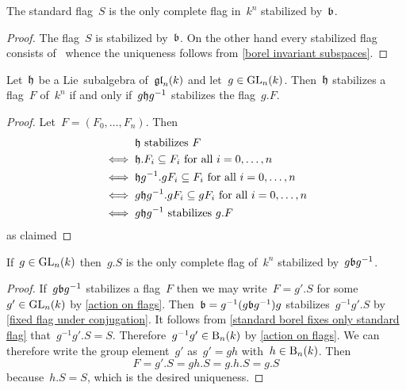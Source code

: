 \begin{corollary}
  \label{standard borel fixes only standard flag}
  The standard flag~$S$ is the only complete flag in~$k^n$ stabilized by~$\blie$.
\end{corollary}

\begin{proof}
  The flag~$S$ is stabilized by~$\blie$.
  On the other hand every stabilized flag consists of~{\subrepresentations{$\blie$}} whence the uniqueness follows from \cref{borel invariant subspaces}.
\end{proof}

\begin{lemma}
  \label{fixed flag under conjugation}
  Let~$\mathfrak{h}$ be a Lie~subalgebra of~$\mathfrak{gl}_n(k)$ and let~$g \in \operatorname{GL}_n(k)$.
  Then~$\mathfrak{h}$ stabilizes a flag~$F$ of~$k^n$ if and only if~$g \mathfrak{h} g^{-1}$ stabilizes the flag~$g.F$.
\end{lemma}

\begin{proof}
  Let~$F = (F_0, \dotsc, F_n)$.
  Then
  \begin{align*}
    {}&
    \text{$\mathfrak{h}$ stabilizes~$F$}
    \\
    \iff{}&
    \text{$\mathfrak{h}.F_i \subseteq F_i$ for all~$i = 0, \dotsc, n$}
    \\
    \iff{}&
    \text{$\mathfrak{h} g^{-1} . g F_i \subseteq F_i$ for all~$i = 0, \dotsc, n$}
    \\
    \iff{}&
    \text{$g \mathfrak{h} g^{-1} . g F_i \subseteq g F_i$ for all~$i = 0, \dotsc, n$}
    \\
    \iff{}&
    \text{$g \mathfrak{h} g^{-1}$ stabilizes~$g.F$} 
  \end{align*}
  as claimed
\end{proof}

\begin{corollary}
  \label{unique fixed flag of borel}
  If~$g \in \operatorname{GL}_n(k)$ then~$g.S$ is the only complete flag of~$k^n$ stabilized by~$g \mathfrak{b} g^{-1}$.
\end{corollary}

\begin{proof}
  If~$g \mathfrak{b} g^{-1}$ stabilizes a flag~$F$ then we may write~$F = g'.S$ for some~$g' \in \operatorname{GL}_n(k)$ by \cref{action on flags}.
  Then~$\mathfrak{b} = g^{-1} (g \mathfrak{b} g^{-1}) g$ stabilizes~$g^{-1} g'.S$ by \cref{fixed flag under conjugation}.
  It follows from \cref{standard borel fixes only standard flag} that~$g^{-1} g'.S = S$.
  Therefore~$g^{-1} g' \in \operatorname{B}_n(k)$ by \cref{action on flags}.
  We can therefore write the group element~$g'$ as~$g' = g h$ with~$h \in \operatorname{B}_n(k)$.
  Then
  \[
    F
    =
    g'.S
    =
    gh.S
    =
    g.h.S
    =
    g.S
  \]
  because~$h.S = S$, which is the desired uniqueness.
\end{proof}





